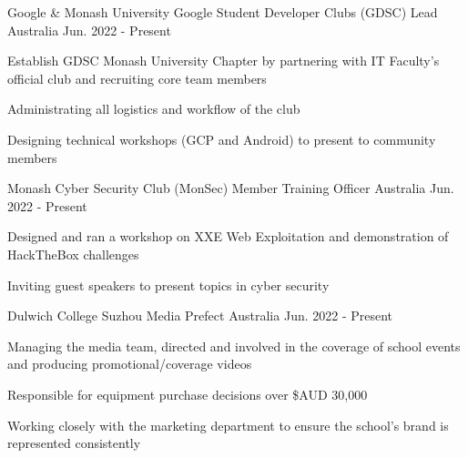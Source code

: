 

\begin{cventries}

    \cventry
    {Google \& Monash University} %
    {Google Student Developer Clubs (GDSC) Lead} %
    {Australia} %
    {Jun. 2022 - Present} %
    {
        \begin{cvitems} %
            \item {Establish GDSC Monash University Chapter by partnering with IT Faculty's official club and recruiting core team members}
            \item {Administrating all logistics and workflow of the club}
            \item {Designing technical workshops (GCP and Android) to present to community members}
        \end{cvitems}
    }

    \cventry
    {Monash Cyber Security Club (MonSec)} %
    {Member Training Officer} %
    {Australia} %
    {Jun. 2022 - Present} %
    {
        \begin{cvitems} %
            \item {Designed and ran a workshop on XXE Web Exploitation and demonstration of HackTheBox challenges}
            \item {Inviting guest speakers to present topics in cyber security}
        \end{cvitems}
    }


    \cventry
    {Dulwich College Suzhou} %
    {Media Prefect} %
    {Australia} %
    {Jun. 2022 - Present} %
    {
        \begin{cvitems} %
            \item {Managing the media team, directed and involved in the coverage of school events and producing promotional/coverage videos}
            \item {Responsible for equipment purchase decisions over \$AUD 30,000}
            \item {Working closely with the marketing department to ensure the school's brand is represented consistently}
        \end{cvitems}
    }



\end{cventries}
